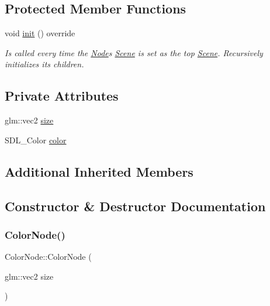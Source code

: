 \subsection*{Protected Member Functions}
\begin{DoxyCompactItemize}
\item 
void \mbox{\hyperlink{classsage_1_1ColorNode_a1a5a055be2cc8d15b38c5c25eb489e94}{init}} () override
\begin{DoxyCompactList}\small\item\em Is called every time the \mbox{\hyperlink{classsage_1_1Node}{Node}}\textquotesingle{}s \mbox{\hyperlink{classsage_1_1Scene}{Scene}} is set as the top \mbox{\hyperlink{classsage_1_1Scene}{Scene}}. Recursively initializes its children. \end{DoxyCompactList}\end{DoxyCompactItemize}
\subsection*{Private Attributes}
\begin{DoxyCompactItemize}
\item 
glm\+::vec2 \mbox{\hyperlink{classsage_1_1ColorNode_a04b687374b9c171ff820c514f15b0ae0}{size}}
\item 
S\+D\+L\+\_\+\+Color \mbox{\hyperlink{classsage_1_1ColorNode_aad5832e161e608730df9512894725d2d}{color}}
\end{DoxyCompactItemize}
\subsection*{Additional Inherited Members}


\subsection{Constructor \& Destructor Documentation}
\mbox{\label{classsage_1_1ColorNode_a2a7235f477d542f28f6bbf1bda63176a}} 
\subsubsection{\texorpdfstring{ColorNode()}{ColorNode()}\hspace{0.1cm}{\footnotesize\ttfamily [1/2]}}
{\footnotesize\ttfamily Color\+Node\+::\+Color\+Node (\begin{DoxyParamCaption}\item[{glm\+::vec2}]{size }\end{DoxyParamCaption})}

